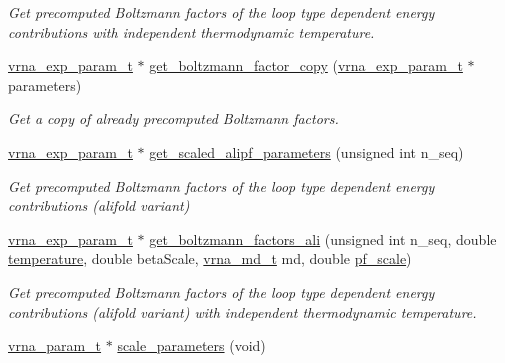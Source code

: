 \begin{DoxyCompactItemize}
\begin{DoxyCompactList}\small\item\em Get precomputed Boltzmann factors of the loop type dependent energy contributions with independent thermodynamic temperature. \end{DoxyCompactList}\item 
\mbox{\hyperlink{group__energy__parameters_ga01d8b92fe734df8d79a6169482c7d8d8}{vrna\+\_\+exp\+\_\+param\+\_\+t}} $\ast$ \mbox{\hyperlink{group__energy__parameters_ga665a446ba8ff211e551297a8fa36ec27}{get\+\_\+boltzmann\+\_\+factor\+\_\+copy}} (\mbox{\hyperlink{group__energy__parameters_ga01d8b92fe734df8d79a6169482c7d8d8}{vrna\+\_\+exp\+\_\+param\+\_\+t}} $\ast$parameters)
\begin{DoxyCompactList}\small\item\em Get a copy of already precomputed Boltzmann factors. \end{DoxyCompactList}\item 
\mbox{\hyperlink{group__energy__parameters_ga01d8b92fe734df8d79a6169482c7d8d8}{vrna\+\_\+exp\+\_\+param\+\_\+t}} $\ast$ \mbox{\hyperlink{group__energy__parameters_ga0ccf4e1be085a573533fd6b9da2d8cf9}{get\+\_\+scaled\+\_\+alipf\+\_\+parameters}} (unsigned int n\+\_\+seq)
\begin{DoxyCompactList}\small\item\em Get precomputed Boltzmann factors of the loop type dependent energy contributions (alifold variant) \end{DoxyCompactList}\item 
\mbox{\hyperlink{group__energy__parameters_ga01d8b92fe734df8d79a6169482c7d8d8}{vrna\+\_\+exp\+\_\+param\+\_\+t}} $\ast$ \mbox{\hyperlink{group__energy__parameters_ga2aa1d87c97f35d2e4121634a17556829}{get\+\_\+boltzmann\+\_\+factors\+\_\+ali}} (unsigned int n\+\_\+seq, double \mbox{\hyperlink{group__model__details_gab4b11c8d9c758430960896bc3fe82ead}{temperature}}, double beta\+Scale, \mbox{\hyperlink{group__model__details_ga1f8a10e12a0a1915f2a4eff0b28ea17c}{vrna\+\_\+md\+\_\+t}} md, double \mbox{\hyperlink{group__model__details_gad3b22044065acc6dee0af68931b52cfd}{pf\+\_\+scale}})
\begin{DoxyCompactList}\small\item\em Get precomputed Boltzmann factors of the loop type dependent energy contributions (alifold variant) with independent thermodynamic temperature. \end{DoxyCompactList}\item 
\mbox{\hyperlink{group__energy__parameters_ga8a69ca7d787e4fd6079914f5343a1f35}{vrna\+\_\+param\+\_\+t}} $\ast$ \mbox{\hyperlink{group__energy__parameters_ga541f2cf7436e9bc939b0a49b24baf987}{scale\+\_\+parameters}} (void)

\end{DoxyCompactItemize}
